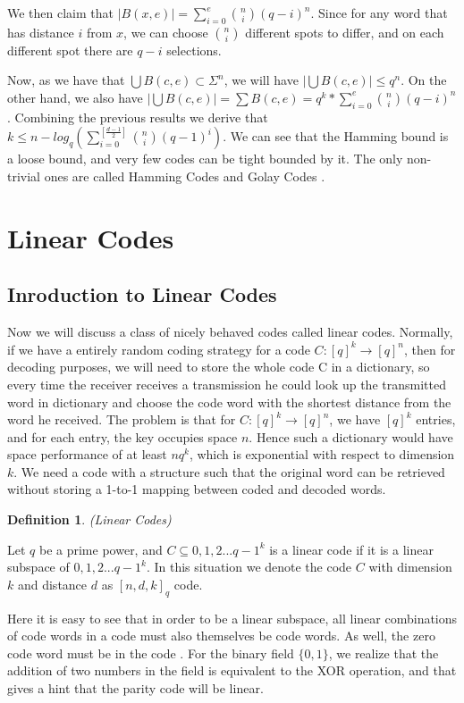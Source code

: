 \documentclass{article}
\newtheorem{Definition}{Definition}
\begin{document}
We then claim that $|B(x,e)| = \sum_{i=0}^{e} {n \choose i}(q-i)^n$. Since for any word that has distance $i$ from $x$, we can choose ${n \choose i}$ different spots to differ, and on each different spot there are $q-i$ selections.

Now, as we have that $\bigcup B(c,e) \subset \Sigma^n$, we will have $|\bigcup B(c,e)| \le q^n$. On the other hand, we also have $|\bigcup B(c,e)| = \sum B(c,e) = q^k* \sum_{i=0}^{e} {n \choose i}(q-i)^n$. Combining the previous results we derive that $k \le n - log_q(\sum_{i=0}^{[\frac{d-1}{2}]}{n \choose i} (q-1)^i)$. We can see that the Hamming bound is a loose bound, and very few codes can be tight bounded by it. The only non-trivial ones are called Hamming Codes and Golay Codes \cite{hamming-code, golay, hill}.\\
\section{Linear Codes}
\subsection{Inroduction to Linear Codes}
Now we will discuss a class of nicely behaved codes called linear codes. Normally, if we have a entirely random coding strategy for a code $C:[q]^k \rightarrow [q]^n$, then for decoding purposes, we will need to store the whole code C in a dictionary, so every time the receiver receives a transmission he could look up the transmitted word in dictionary and choose the code word with the shortest distance from the word he received. The problem is that for $C:[q]^k \rightarrow [q]^n$, we have $[q]^k$ entries, and for each entry, the key occupies space $n$. Hence such a dictionary would have space performance of at least $nq^k$, which is exponential with respect to dimension $k$. We need a code with a structure such that the original word can be retrieved without storing a 1-to-1 mapping between coded and decoded words.
\begin{Definition}(Linear Codes)\end{Definition}
\noindent Let $q$ be a prime power, and $C \subseteq {0,1,2...q-1}^k$ is a linear code if it is a linear subspace of ${0,1,2...q-1}^k$. In this situation we denote the code $C$ with dimension $k$ and distance $d$ as $[n,d,k]_q$ code.

Here it is easy to see that in order to be a linear subspace, all linear combinations of code words in a code must also themselves be code words. As well, the zero code word must be in the code . For the binary field $\{0,1\}$, we realize that the addition of two numbers in the field is equivalent to the XOR operation, and that gives a hint that the parity code will be linear.
\end{document}
